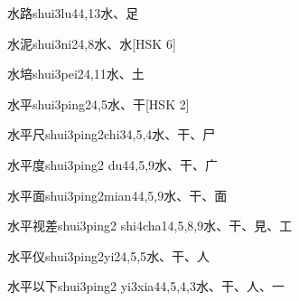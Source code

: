 \begin{EntryWithPhonetic}{水路}{shui3lu4}{4,13}{⽔、⾜}
\end{EntryWithPhonetic}

\begin{EntryWithPhonetic}{水泥}{shui3ni2}{4,8}{⽔、⽔}[HSK 6]
\end{EntryWithPhonetic}

\begin{EntryWithPhonetic}{水培}{shui3pei2}{4,11}{⽔、⼟}
\end{EntryWithPhonetic}

\begin{EntryWithPhonetic}{水平}{shui3ping2}{4,5}{⽔、⼲}[HSK 2]
\end{EntryWithPhonetic}

\begin{EntryWithPhonetic}{水平尺}{shui3ping2chi3}{4,5,4}{⽔、⼲、⼫}
\end{EntryWithPhonetic}

\begin{EntryWithPhonetic}{水平度}{shui3ping2 du4}{4,5,9}{⽔、⼲、⼴}
\end{EntryWithPhonetic}

\begin{EntryWithPhonetic}{水平面}{shui3ping2mian4}{4,5,9}{⽔、⼲、⾯}
\end{EntryWithPhonetic}

\begin{EntryWithPhonetic}{水平视差}{shui3ping2 shi4cha1}{4,5,8,9}{⽔、⼲、⾒、⼯}
\end{EntryWithPhonetic}

\begin{EntryWithPhonetic}{水平仪}{shui3ping2yi2}{4,5,5}{⽔、⼲、⼈}
\end{EntryWithPhonetic}

\begin{EntryWithPhonetic}{水平以下}{shui3ping2 yi3xia4}{4,5,4,3}{⽔、⼲、⼈、⼀}
\end{EntryWithPhonetic}

